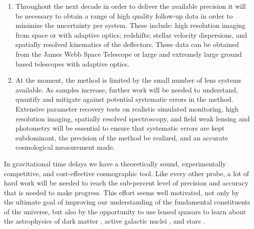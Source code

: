 \begin{enumerate}
%
\item Throughout the next decade in order to deliver the
available precision it will be necessary to obtain a range of high
quality follow-up data in order to minimize the uncertainty per
system. These include: high resolution imaging from space or with
adaptive optics; redshifts; stellar velocity dispersions, and
spatially resolved kinematics of the deflectors. These data can be
obtained from the James Webb Space Telescope or large and extremely
large ground based telescopes with adaptive optics.
%
%
\item  At the moment, the method is limited by the small number of lens
systems available. As samples increase, further work will be needed to
understand, quantify and mitigate against potential systematic errors
in the method. Extensive parameter recovery tests on realistic
simulated monitoring, high resolution imaging, spatially resolved
spectroscopy, and field weak lensing and photometry will be essential
to ensure that systematic errors are kept subdominant, the precision
of the method be realized, and an accurate cosmological measurement
made.
\end{enumerate}


In gravitational time delays we have a theoretically sound,
experimentally competitive, and cost-effective cosmographic tool.
Like every other probe, a lot of hard work will be needed to reach the
sub-percent level of precision and accuracy that is needed to make
progress. This effort seems well motivated, not only by the ultimate
goal of improving our understanding of the fundamental constituents of
the universe, but also by the opportunity to use lensed quasars to
learn about the astrophysics of dark matter
\citep{M+M01,D+K02,Metcalf:2005p1203,Xu++09,Veg++14,Nie++14}, active galactic
nuclei \citep{PMK08,Eig++08a,Eig++08b,Blackburne:2010p6600,Mac++15},
and stars
\citep{Sch++14}.

